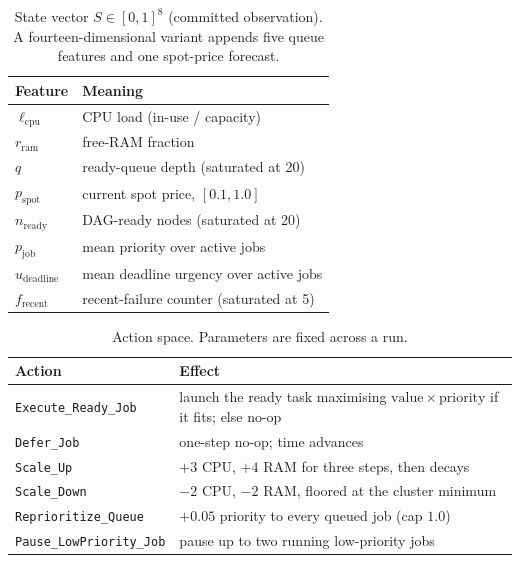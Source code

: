 \documentclass[10pt,twocolumn]{article}
\newcommand{\term}[1]{\texttt{#1}}
\begin{document}
\begin{table}[t]
\centering
\caption{State vector $S\in[0,1]^8$ (committed observation). A fourteen-dimensional
variant appends five queue features and one spot-price forecast.}
\label{tab:state}
\small
\begin{tabularx}{\columnwidth}{@{}lY@{}}
\toprule
\textbf{Feature} & \textbf{Meaning} \\
\midrule
$\ell_{\mathrm{cpu}}$        & CPU load (in-use / capacity) \\
$r_{\mathrm{ram}}$           & free-RAM fraction \\
$q$                          & ready-queue depth (saturated at 20) \\
$p_{\mathrm{spot}}$          & current spot price, $[0.1,1.0]$ \\
$n_{\mathrm{ready}}$         & DAG-ready nodes (saturated at 20) \\
$p_{\mathrm{job}}$           & mean priority over active jobs \\
$u_{\mathrm{deadline}}$      & mean deadline urgency over active jobs \\
$f_{\mathrm{recent}}$        & recent-failure counter (saturated at 5) \\
\bottomrule
\end{tabularx}
\end{table}

\begin{table}[t]
\centering
\caption{Action space. Parameters are fixed across a run.}
\label{tab:actions}
\small
\begin{tabularx}{\columnwidth}{@{}lY@{}}
\toprule
\textbf{Action} & \textbf{Effect} \\
\midrule
\term{Execute\_Ready\_Job}   & launch the ready task maximising $\mathrm{value}\times\mathrm{priority}$ if it fits; else no-op \\
\term{Defer\_Job}            & one-step no-op; time advances \\
\term{Scale\_Up}             & $+3$ CPU, $+4$ RAM for three steps, then decays \\
\term{Scale\_Down}           & $-2$ CPU, $-2$ RAM, floored at the cluster minimum \\
\term{Reprioritize\_Queue}   & $+0.05$ priority to every queued job (cap $1.0$) \\
\term{Pause\_LowPriority\_Job} & pause up to two running low-priority jobs \\
\bottomrule
\end{tabularx}
\end{table}
\end{document}
